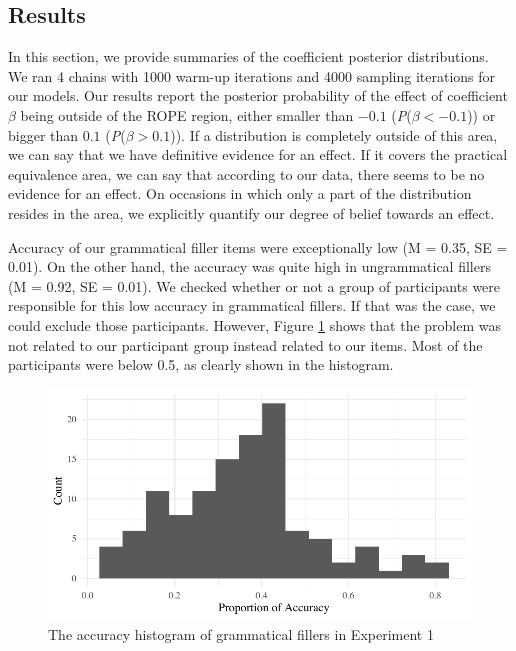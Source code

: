 \subsection{Results}

In this section, we provide summaries of the coefficient posterior distributions. We ran 4 chains with 1000 warm-up iterations and 4000 sampling iterations for our models. Our results report the posterior probability of the effect of coefficient $\beta$ being outside of the ROPE region, either smaller than $-0.1$ (\emph{P}($\beta < -0.1$)) or bigger than $0.1$ (\emph{P}($\beta > 0.1$)). If a distribution is completely outside of this area, we can say that we have definitive evidence for an effect. If it covers the practical equivalence area, we can say that according to our data, there seems to be no evidence for an effect. On occasions in which only a part of the distribution resides in the area, we explicitly quantify our degree of belief towards an effect. 

Accuracy of our grammatical filler items were exceptionally low (M = 0.35, SE = 0.01). On the other hand, the accuracy was quite high in ungrammatical fillers (M = 0.92, SE = 0.01). We checked whether or not a group of participants were responsible for this low accuracy in grammatical fillers. If that was the case, we could exclude those participants. However, Figure \ref{fig:exp1gFillHistogram} shows that the problem was not related to our participant group instead related to our items. Most of the participants were below 0.5, as clearly shown in the histogram.

\begin{knitrout}
\color{fgcolor}\begin{figure}[hbt!]

{\centering \includegraphics[width=\linewidth]{figure/exp1gFillHistogram-1} 

}

\caption[The accuracy histogram of grammatical fillers in Experiment 1]{The accuracy histogram of grammatical fillers in Experiment 1}\label{fig:exp1gFillHistogram}
\end{figure}

\end{knitrout}

